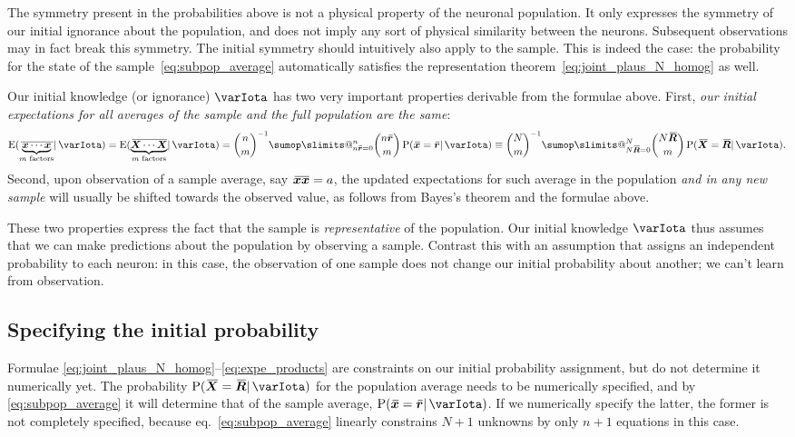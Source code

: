 \documentclass{article}
\makeatletter
\theoremstyle{remark}
\theoremstyle{innote}
\def\sum{\DOTSI\sumop\slimits@}
\renewcommand*{\|}{\mathpunct{|}}%
\newcommand*{\p}{\mathrm{P}}%
\newcommand*{\eqn}{eq.}%
\newcommand*{\E}{\mathrm{E}}
\DeclarePairedDelimiter\expp{(}{)}
\newcommand*{\expe}{\E\expp}%
\theoremstyle{simple}
\newcommand*{\widebar}[1]{{\mkern1.5mu\skew{2}\overline{\mkern-1.5mu#1\mkern-1.5mu}\mkern 1.5mu}}
\newcommand*{\av}{\widebar} %
\newcommand*{\sav}{\widebar} %
\newcommand*{\yxx}{x}%
\newcommand*{\yx}{\bm{\yxx}}%
\newcommand*{\yxs}{\sav{\yx}}%
\newcommand*{\yX}{\bm{X}}%
\newcommand*{\yXf}{\av{\yX}}%
\newcommand*{\yxxs}{\sav{\yx\yx}}%
\newcommand*{\yr}{\bm{r}}%
\newcommand*{\yrs}{\sav{\yr}}%
\newcommand*{\yR}{\bm{R}}%
\newcommand*{\yRf}{\av{\yR}}%
\newcommand*{\yH}{\varIota}
\makeatother
\begin{document}
The symmetry present in the probabilities above is not a physical property
of the neuronal population. It only expresses the symmetry of our initial
ignorance about the population, and does not imply any sort of physical
similarity between the neurons. Subsequent observations may in fact break
this symmetry. The initial symmetry should intuitively also apply to the
sample. This is indeed the case: the probability for the state of the
sample~\eqref{eq:subpop_average} automatically satisfies the representation
theorem~\eqref{eq:joint_plaus_N_homog} as well.

Our initial knowledge (or ignorance) $\yH$ has two very important
properties derivable from the formulae above. First, \emph{our initial
  expectations for all averages of the sample and the full population are
  the same}:
\begin{equation}
  \label{eq:expe_products}
\expe{\sav{\underbrace{\yx \dotsm \yx}_{\text{$m$ factors}}} \| \yH}
=
\expe{\av{\underbrace{\yX \dotsm \yX}_{\text{$m$ factors}}} \| \yH}
=
\binom{n}{m}^{-1}
\sum_{n \yrs=0}^n %
\binom{n \yrs}{m}\, \p(\yxs=\yrs \| \yH)
\equiv
\binom{N}{m}^{-1}
\sum_{N \yRf=0}^N %
\binom{N \yRf}{m}\, \p(\yXf=\yRf \| \yH).
\end{equation}
Second, upon observation of a sample average, say $\yxxs=a$, the updated
expectations for such average in the population \emph{and in any new
  sample} will usually be shifted towards the observed value, as follows
from Bayes's theorem and the formulae above.

These two properties express the fact that the sample is
\emph{representative} of the population. Our initial knowledge $\yH$ thus
assumes that we can make predictions about the population by observing a
sample. Contrast this with an assumption that assigns an independent
probability to each neuron: in this case, the observation of one sample
does not change our initial probability about another; we can't learn from
observation.

\subsection{Specifying the initial probability}
\label{sec:specific_initial_probability}

Formulae \eqref{eq:joint_plaus_N_homog}--\eqref{eq:expe_products} are
constraints on our initial probability assignment, but do not determine it
numerically yet. The probability $\p(\yXf=\yRf \| \yH)$ for the population
average needs to be numerically specified, and by \eqref{eq:subpop_average}
it will determine that of the sample average, $\p(\yxs=\yrs \| \yH)$. If we
numerically specify the latter, the former is not completely specified,
because \eqn~\eqref{eq:subpop_average} linearly constrains $N+1$ unknowns
by only $n+1$ equations in this case.
\end{document}
